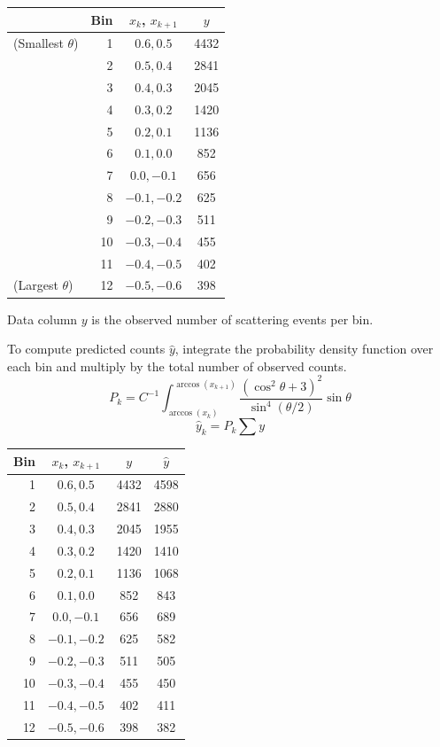 \documentclass[12pt]{article}
\begin{document}
\begin{center}
\begin{tabular}{|lr|c|c|}
\hline
& Bin & $x_k$, $x_{k+1}$ & $y$\\
\hline
(Smallest $\theta$) & 1 & $0.6, 0.5$ & 4432\\
& 2 & $0.5, 0.4$ & 2841\\
& 3 & $0.4, 0.3$ & 2045\\
& 4 & $0.3, 0.2$ & 1420\\
& 5 & $0.2, 0.1$ & 1136\\
& 6 & $0.1, 0.0$ & 852\\
& 7 & $0.0, -0.1$ & 656\\
& 8 & $-0.1, -0.2$ & 625\\
& 9 & $-0.2, -0.3$ & 511\\
& 10 & $-0.3, -0.4$ & 455\\
& 11 & $-0.4, -0.5$ & 402\\
(Largest $\theta$) & 12 & $-0.5, -0.6$ & 398\\
\hline
\end{tabular}
\end{center}

\noindent
Data column $y$ is the observed number of scattering events per bin.

\bigskip
\noindent
To compute predicted counts $\hat{y}$, integrate the probability density function
over each bin and multiply by the total number of observed counts.
\begin{equation*}
P_k=C^{-1}\int_{\arccos(x_k)}^{\arccos(x_{k+1})}
\frac{\left(\cos^2\theta+3\right)^2}{\sin^4(\theta/2)}\sin\theta
\end{equation*}
\begin{equation*}
\hat{y}_k=P_k\sum y
\end{equation*}

\noindent

\begin{center}
\begin{tabular}{|r|c|c|c|}
\hline
Bin & $x_k$, $x_{k+1}$ & $y$ & $\hat{y}$ \\
\hline
1 & $0.6, 0.5$ & 4432 & 4598\\
2 & $0.5, 0.4$ & 2841 & 2880\\
3 & $0.4, 0.3$ & 2045 & 1955\\
4 & $0.3, 0.2$ & 1420 & 1410\\
5 & $0.2, 0.1$ & 1136 & 1068\\
6 & $0.1, 0.0$ & 852 & 843\\
7 & $0.0, -0.1$ & 656 & 689\\
8 & $-0.1, -0.2$ & 625 & 582\\
9 & $-0.2, -0.3$ & 511 & 505\\
10 & $-0.3, -0.4$ & 455 & 450\\
11 & $-0.4, -0.5$ & 402 & 411\\
12 & $-0.5, -0.6$ & 398 & 382\\
\hline
\end{tabular}
\end{center}
\end{document}

